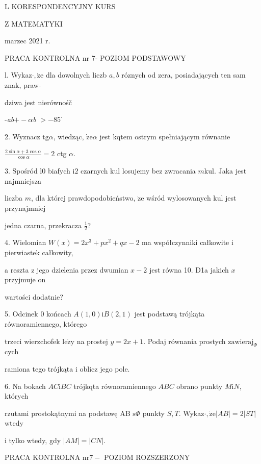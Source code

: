 \documentclass[a4paper,12pt]{article}
\begin{document}
L KORESPONDENCYJNY KURS

Z MATEMATYKI

marzec 2021 r.

PRACA KONTROLNA nr 7- POZIOM PODSTAWOWY

l. Wykaz$\cdot, \dot{\mathrm{z}}\mathrm{e}$ dla dowolnych liczb $a, b$ róznych od zera, posiadających ten sam znak, praw-

dziwa jest nierównośč

-{\it ab}$+-\alpha${\it b} $> -85^{\cdot}$

2. Wyznacz $\mathrm{t}\mathrm{g}\alpha$, wiedząc, $\dot{\mathrm{z}}\mathrm{e}\alpha$ jest kqtem ostrym spełniającym równanie

$\displaystyle \frac{2\sin\alpha+3\cos\alpha}{\cos\alpha}=2$ ctg $\alpha.$

3. Spośród l0 biafych $\mathrm{i}2$ czarnych kul losujemy bez zwracania $m\mathrm{k}\mathrm{u}\mathrm{l}$. Jaka jest najmniejsza

liczba $m$, dla której prawdopodobieństwo, $\dot{\mathrm{z}}\mathrm{e}$ wśród wylosowanych kul jest przynajmniej

jedna czarna, przekracza $\displaystyle \frac{1}{2}$?

4. Wielomian $W(x)=2x^{3}+px^{2}+qx-2$ ma współczynniki całkowite $\mathrm{i}$ pierwiastek całkowity,

a reszta $\mathrm{z}$ jego dzielenia przez dwumian $x-2$ jest równa 10. D1a jakich $x$ przyjmuje on

wartości dodatnie?

5. Odcinek $0$ końcach $A(1,0) \mathrm{i}B(2,1)$ jest podstawą trójkąta równoramiennego, którego

trzeci wierzchofek $\mathrm{l}\mathrm{e}\dot{\mathrm{z}}\mathrm{y}$ na prostej $y=2x+1$. Podaj równania prostych $\mathrm{z}\mathrm{a}\mathrm{w}\mathrm{i}\mathrm{e}\mathrm{r}\mathrm{a}\mathrm{j}_{\Phi}$cych

ramiona tego trójkąta $\mathrm{i}$ oblicz jego pole.

6. Na bokach $AC\mathrm{i}BC$ trójkqta równoramiennego $ABC$ obrano punkty $M\mathrm{i}N$, których

rzutami prostokątnymi na podstawę AB $\mathrm{s}\Phi$ punkty $S, T$. Wykaz$\cdot, \dot{\mathrm{z}}\mathrm{e}|AB|=2|ST|$ wtedy

$\mathrm{i}$ tylko wtedy, gdy $|AM|=|CN|.$




PRACA KONTROLNA $\mathrm{n}\mathrm{r} 7-$ POZIOM ROZSZERZONY
\end{document}
